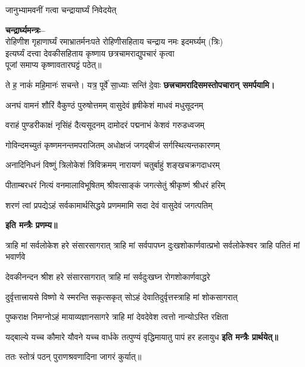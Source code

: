 \begin{center}
{जानुभ्यामवनीं गत्वा चन्द्रायार्घ्यं निवेदयेत्}

\textbf{चन्द्रार्घ्यमन्त्रः–}\\
{रोहिणीश गृहाणार्घ्यं रमाभ्रातर्मनःपते}
रोहिणीसहिताय चन्द्राय नमः इदमर्घ्यम् (त्रिः)\\

इत्यर्घ्यं दत्त्वा देवकीसहिताय कृष्णाय छत्रचामराद्युपचारं कृत्वा\\पूजां समाप्य कृष्णावतारघट्टं पठेत्॥

{ते ह॒ नाकं॑ महि॒मानः॑ सचन्ते। यत्र॒ पूर्वे॑ सा॒ध्याः सन्ति॑ दे॒वाः}
\textbf{\devAya{} छत्त्रचामरादिसमस्तोपचारान् समर्पयामि।}
\medskip

\twolineshloka
{अनघं वामनं शौरिं वैकुण्ठं पुरुषोत्तमम्}
{वासुदेवं हृषीकेशं माधवं मधुसूदनम्}

\twolineshloka
{वराहं पुण्डरीकाक्षं नृसिंहं दैत्यसूदनम्}
{दामोदरं पद्मनाभं केशवं गरुडध्वजम्}

\twolineshloka
{गोविन्दमच्युतं कृष्णमनन्तमपराजितम्}
{अधोक्षजं जगद्बीजं सर्गस्थित्यन्तकारणम्}

\twolineshloka
{अनादिनिधनं विष्णुं त्रिलोकेशं त्रिविक्रमम्}
{नारायणं चतुर्बाहुं शङ्खचक्रगदाधरम्}

\twolineshloka
{पीताम्बरधरं नित्यं वनमालाविभूषितम्}
{श्रीवत्साङ्कं जगत्सेतुं श्रीकृष्णं श्रीधरं हरिम्}

\twolineshloka
{शरणं त्वां प्रपद्येऽहं सर्वकामार्थसिद्धये}
{प्रणममामि सदा देवं वासुदेवं जगत्पतिम्}

\textbf{इति मन्त्रैः प्रणम्य॥}

\resetShloka
\threelineshloka
{त्राहि मां सर्वलोकेश हरे संसारसागरात्}
{त्राहि मां सर्वपापघ्न दुःखशोकार्णवात्प्रभो}
{सर्वलोकेश्वर त्राहि पतितं मां भवार्णवे}

\twolineshloka
{देवकीनन्दन श्रीश हरे संसारसागरात्}
{त्राहि मां सर्वदुःखघ्न रोगशोकार्णवाद्धरे}

\twolineshloka
{दुर्वृत्तात्त्रायसे विष्णो ये स्मरन्ति सकृत्सकृत्}
{सोऽहं देवातिदुर्वृत्तस्त्राहि मां शोकसागरात्}

\twolineshloka
{पुष्कराक्ष निमग्नोऽहं मायाव्यज्ञानसागरे}
{त्राहि मां देवदेवेश त्वत्तो नान्योऽस्ति रक्षिता}

\twolineshloka
{यद्बाल्ये यच्च कौमारे यौवने यच्च वार्धके}
{तत्पुण्यं वृद्धिमायातु पापं हर हलायुध}
\textbf{इति मन्त्रैः प्रार्थयेत्॥}

ततः स्तोत्रं पठन् पुराणश्रवणादिना जागरं कुर्यात्॥


\end{center}
